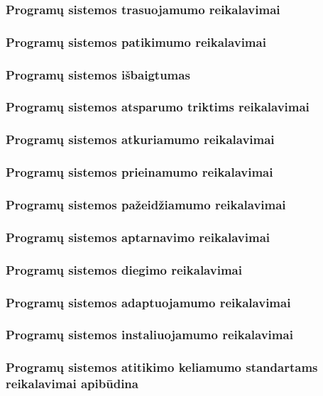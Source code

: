\documentclass{VUMIFPSkursinis}
\begin{document}
	\subsubsection{Programų sistemos trasuojamumo reikalavimai}
	\subsubsection{Programų sistemos patikimumo reikalavimai}
	\subsubsection{Programų sistemos išbaigtumas}
	\subsubsection{Programų sistemos atsparumo triktims reikalavimai}
	\subsubsection{Programų sistemos atkuriamumo reikalavimai}
	\subsubsection{Programų sistemos prieinamumo reikalavimai}
	\subsubsection{Programų sistemos pažeidžiamumo reikalavimai}
	\subsubsection{Programų sistemos aptarnavimo reikalavimai}
	\subsubsection{Programų sistemos diegimo reikalavimai}
	\subsubsection{Programų sistemos adaptuojamumo reikalavimai}
	\subsubsection{Programų sistemos instaliuojamumo reikalavimai}
	\subsubsection{Programų sistemos atitikimo keliamumo standartams reikalavimai apibūdina}
\end{document}

